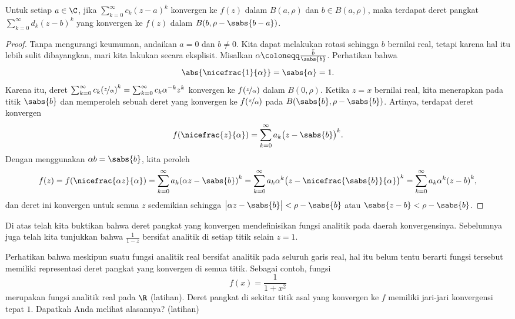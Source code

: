 \begin{cor} \label{cor:powerseranalytic}
Untuk setiap $a \in \C$,
jika $\sum_{k=0}^\infty c_k {(z-a)}^k$ konvergen ke $f(z)$ dalam $B(a,\rho)$ dan $b \in
B(a,\rho)$,
maka terdapat deret pangkat
$\sum_{k=0}^\infty d_k {(z-b)}^k$ yang konvergen ke $f(z)$ dalam $B(b,\rho-\sabs{b-a})$.
\end{cor}

\begin{proof}
Tanpa mengurangi keumuman, andaikan $a=0$ dan $b \neq 0$.  Kita dapat melakukan rotasi sehingga $b$ bernilai real, tetapi
karena hal itu lebih sulit dibayangkan, mari kita lakukan secara eksplisit.
Misalkan $\alpha \coloneqq \frac{\bar{b}}{\sabs{b}}$.
Perhatikan bahwa
\begin{equation*}
\abs{\nicefrac{1}{\alpha}} = \sabs{\alpha}
= 1 .
\end{equation*}
Karena itu, deret
$\sum_{k=0}^\infty c_k {(\nicefrac{z}{\alpha})}^k = 
\sum_{k=0}^\infty c_k \alpha^{-k} {z}^k$
konvergen ke $f(\nicefrac{z}{\alpha})$ dalam $B(0,\rho)$.
Ketika $z=x$ bernilai real,
kita menerapkan  pada titik $\sabs{b}$ dan memperoleh
sebuah deret yang konvergen
ke $f(\nicefrac{z}{\alpha})$ pada $B(\sabs{b},\rho-\sabs{b})$.
Artinya, terdapat deret konvergen
\begin{equation*}
f(\nicefrac{z}{\alpha}) =
\sum_{k=0}^\infty a_k {\bigl(z - \sabs{b}\bigr)}^k .
\end{equation*}
Dengan menggunakan $\alpha b = \sabs{b}$, kita peroleh
\begin{equation*}
f(z) = f(\nicefrac{\alpha z}{\alpha}) =
\sum_{k=0}^\infty a_k {(\alpha z - \sabs{b})}^k 
=
\sum_{k=0}^\infty a_k\alpha^k {\bigl(z - \nicefrac{\sabs{b}}{\alpha}\bigr)}^k
=
\sum_{k=0}^\infty a_k\alpha^k {(z - b)}^k ,
\end{equation*}
dan deret ini konvergen untuk semua $z$ sedemikian sehingga
$\bigl\lvert \alpha z-\sabs{b}\bigr\rvert < \rho-\sabs{b}$
atau $\sabs{z - b} < \rho-\sabs{b}$.
\end{proof}

Di atas telah kita buktikan bahwa deret pangkat yang konvergen mendefinisikan
fungsi analitik pada daerah konvergensinya.  Sebelumnya juga telah kita tunjukkan bahwa
$\frac{1}{1-z}$ bersifat analitik di setiap titik selain $z=1$.

Perhatikan bahwa meskipun suatu fungsi analitik real bersifat analitik pada
seluruh garis real, hal itu belum tentu berarti fungsi tersebut memiliki representasi deret pangkat
yang konvergen di semua titik.  Sebagai contoh, fungsi
\begin{equation*}
f(x) = \frac{1}{1+x^2}
\end{equation*}
merupakan fungsi analitik real pada $\R$ (latihan).  Deret
pangkat di sekitar titik asal yang konvergen ke $f$
memiliki jari-jari konvergensi tepat $1$.
Dapatkah Anda melihat alasannya? (latihan)
